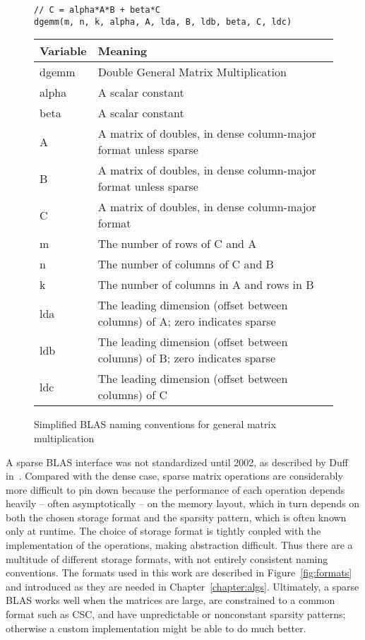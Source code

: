 \begin{figure}
\begin{verbatim}
// C = alpha*A*B + beta*C
dgemm(m, n, k, alpha, A, lda, B, ldb, beta, C, ldc)
\end{verbatim}

\begin{tabular}{ll}
	\toprule
	Variable    &  Meaning \\
	\midrule
	dgemm & Double General Matrix Multiplication \\
	alpha & A scalar constant \\
	beta  & A scalar constant \\
	A     & A matrix of doubles, in dense column-major format unless sparse \\
	B     & A matrix of doubles, in dense column-major format unless sparse \\
	C     & A matrix of doubles, in dense column-major format \\
	m     & The number of rows of C and A \\
	n     & The number of columns of C and B \\
	k     & The number of columns in A and rows in B \\
	lda   & The leading dimension (offset between columns) of A; zero indicates sparse \\
	ldb   & The leading dimension (offset between columns) of B; zero indicates sparse \\
	ldc   & The leading dimension (offset between columns) of C \\


	\bottomrule
\end{tabular}
\caption{Simplified BLAS naming conventions for general matrix multiplication}
\label{fig:blas}
\end{figure}


A sparse BLAS interface was not standardized until 2002, as described by Duff in~\cite{Duff:2002:OSB:567806.567810}. Compared with the dense case, sparse matrix operations are considerably more difficult to pin down because the performance of each operation depends heavily -- often asymptotically -- on the memory layout, which in turn depends on both the chosen storage format and the sparsity pattern, which is often known only at runtime. The choice of storage format is tightly coupled with the implementation of the operations, making abstraction difficult. Thus there are a multitude of different storage formats, with not entirely consistent naming conventions. The formats used in this work are described in Figure~\ref{fig:formats} and introduced as they are needed in Chapter~\ref{chapter:algs}. Ultimately, a sparse BLAS works well when the matrices are large, are constrained to a common format such as CSC, and have unpredictable or nonconstant sparsity patterns; otherwise a custom implementation might be able to do much better.


